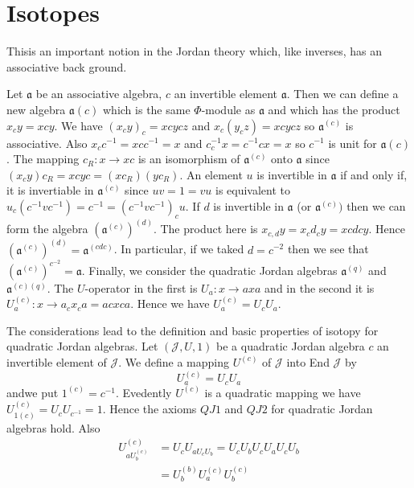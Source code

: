 \section{Isotopes}\label{c1:sec11}

This\pageoriginale is an important notion in the Jordan theory which,
like inverses, has an associative back ground.

Let $\mathfrak{a}$ be an associative algebra, $c$ an invertible
element $\mathfrak{a}$. Then we can define a new algebra
$\mathfrak{a}(c)$ which is the same $\Phi$-module as $\mathfrak{a}$
and which has the product $x_c y=xcy$. We have $(x_cy)_c=xcycz$ and
$x_c(y_cz)=xcy cz$ so $\mathfrak{a}^{(c)}$ is associative. Also
$x_cc^{-1}=xcc^{-1}=x$ and $c^{-1}_cx=c^{-1}c x=x$ so $c^{-1}$ is unit
for $\mathfrak{a}(c)$. The mapping $c_R:x\to xc$ is an isomorphism of
$\mathfrak{a}^{(c)}$ onto $\mathfrak{a}$ since
$(x_cy)c_R=xcyc=(xc_R)(yc_R)$. An element $u$ is invertible in
$\mathfrak{a}$ if and only if, it is invertiable in
$\mathfrak{a}^{(c)}$ since $uv=1=vu$ is equivalent to
$u_c(c^{-1}vc^{-1})=c^{-1}=(c^{-1}vc^{-1})_cu$. If $d$ is invertible
in $\mathfrak{a}$ (or $\mathfrak{a}^{(c)})$ then we can form the
algebra $(\mathfrak{a}^{(c)})^{(d)}$. The product here is
$x_{c,d}y=x_cd_cy=xcdcy$. Hence
$(\mathfrak{a}^{(c)})^{(d)}=\mathfrak{a}^{(cdc)}$. In particular, if
we taked $d=c^{-2}$ then we see that
$(\mathfrak{a}^{(c)})^{c^{-2}}=\mathfrak{a}$. Finally, we consider the
quadratic Jordan algebras $\mathfrak{a}^{(q)}$ and
$\mathfrak{a}^{(c)(q)}$. The $U$-operator in the first is $U_a:x\to
ax a$ and in the second it is $U_a^{(c)}:x\to a_cx_ca=ac x
ca$. Hence we have $U_a^{(c)}=U_cU_a$.

The considerations lead to the definition and basic properties of
isotopy for quadratic Jordan algebras. Let $(\mathscr{J},U,1)$ be a
quadratic Jordan algebra $c$ an invertible element of
$\mathscr{J}$. We define a mapping $U^{(c)}$ of $\mathscr{J}$ into End
$\mathscr{J}$ by
\begin{equation*}
  U_a^{(c)}=U_cU_a\tag{52}\label{c1:eq52}
\end{equation*}
and\pageoriginale we put $1^{(c)}=c^{-1}$. Evedently $U^{(c)}$ is a
  quadratic mapping we have $U_{1(c)}^{(c)}=U_cU_{c^{-1}}=1$. Hence
  the axioms $QJ1$ and $QJ2$ for quadratic Jordan algebras hold. Also
\begin{align*}
  U^{(c)}_{aU^{(c)}_b}&=U_cU_{aU_cU_b}=U_cU_bU_cU_aU_cU_b\\
  &=U_b^{(b)}U_a^{(c)}U_b^{(c)}
\end{align*}

